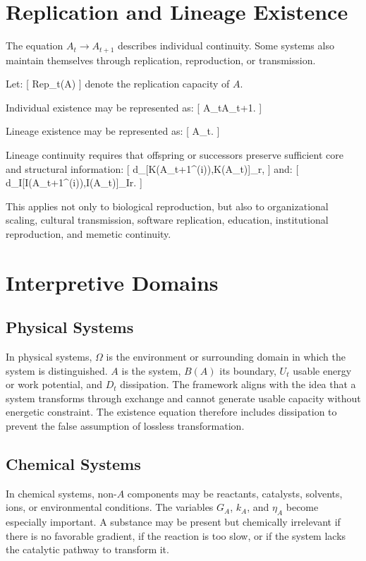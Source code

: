 \documentclass[11pt,a4paper]{article}
\begin{document}
\section{Replication and Lineage Existence}

The equation $A_t\rightarrow A_{t+1}$ describes individual continuity. Some systems also maintain themselves through replication, reproduction, or transmission.

Let:
[
Rep_t(A)
]
denote the replication capacity of $A$.

Individual existence may be represented as:
[
A_t\rightarrow A_{t+1}.
]

Lineage existence may be represented as:
[
A_t.
]

Lineage continuity requires that offspring or successors preserve sufficient core and structural information:
[
d_{\Omega}[K(A_{t+1}^{(i)}),K(A_t)]\leq\theta_r,
]
and:
[
d_I[I(A_{t+1}^{(i)}),I(A_t)]\leq\theta_{Ir}.
]

This applies not only to biological reproduction, but also to organizational scaling, cultural transmission, software replication, education, institutional reproduction, and memetic continuity.

\section{Interpretive Domains}

\subsection{Physical Systems}

In physical systems, $\Omega$ is the environment or surrounding domain in which the system is distinguished. $A$ is the system, $B(A)$ its boundary, $U_t$ usable energy or work potential, and $D_t$ dissipation. The framework aligns with the idea that a system transforms through exchange and cannot generate usable capacity without energetic constraint. The existence equation therefore includes dissipation to prevent the false assumption of lossless transformation.

\subsection{Chemical Systems}

In chemical systems, non-$A$ components may be reactants, catalysts, solvents, ions, or environmental conditions. The variables $G_A$, $k_A$, and $\eta_A$ become especially important. A substance may be present but chemically irrelevant if there is no favorable gradient, if the reaction is too slow, or if the system lacks the catalytic pathway to transform it.
\end{document}
